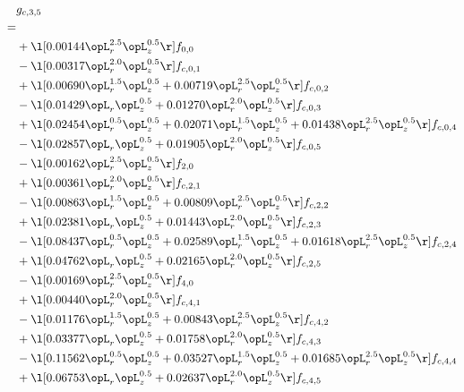 \begin{alignat}{2} 
\label{eq:g_35_0} 
& g_{c,3,5} \nonumber \\ 
 = \\ 
& + \l[  0.00144 \opL_r^{2.5} \opL_z^{0.5}  \r] f_{0,0} \nonumber \\ 
& - \l[  0.00317 \opL_r^{2.0} \opL_z^{0.5}  \r] f_{c,0,1} \nonumber \\ 
& + \l[  0.00690 \opL_r^{1.5} \opL_z^{0.5} +  0.00719 \opL_r^{2.5} \opL_z^{0.5}  \r] f_{c,0,2} \nonumber \\ 
& - \l[  0.01429 \opL_r \opL_z^{0.5} +  0.01270 \opL_r^{2.0} \opL_z^{0.5}  \r] f_{c,0,3} \nonumber \\ 
& + \l[  0.02454 \opL_r^{0.5} \opL_z^{0.5} +  0.02071 \opL_r^{1.5} \opL_z^{0.5} +  0.01438 \opL_r^{2.5} \opL_z^{0.5}  \r] f_{c,0,4} \nonumber \\ 
& - \l[  0.02857 \opL_r \opL_z^{0.5} +  0.01905 \opL_r^{2.0} \opL_z^{0.5}  \r] f_{c,0,5} \nonumber \\ 
& - \l[  0.00162 \opL_r^{2.5} \opL_z^{0.5}  \r] f_{2,0} \nonumber \\ 
& + \l[  0.00361 \opL_r^{2.0} \opL_z^{0.5}  \r] f_{c,2,1} \nonumber \\ 
& - \l[  0.00863 \opL_r^{1.5} \opL_z^{0.5} +  0.00809 \opL_r^{2.5} \opL_z^{0.5}  \r] f_{c,2,2} \nonumber \\ 
& + \l[  0.02381 \opL_r \opL_z^{0.5} +  0.01443 \opL_r^{2.0} \opL_z^{0.5}  \r] f_{c,2,3} \nonumber \\ 
& - \l[  0.08437 \opL_r^{0.5} \opL_z^{0.5} +  0.02589 \opL_r^{1.5} \opL_z^{0.5} +  0.01618 \opL_r^{2.5} \opL_z^{0.5}  \r] f_{c,2,4} \nonumber \\ 
& + \l[  0.04762 \opL_r \opL_z^{0.5} +  0.02165 \opL_r^{2.0} \opL_z^{0.5}  \r] f_{c,2,5} \nonumber \\ 
& - \l[  0.00169 \opL_r^{2.5} \opL_z^{0.5}  \r] f_{4,0} \nonumber \\ 
& + \l[  0.00440 \opL_r^{2.0} \opL_z^{0.5}  \r] f_{c,4,1} \nonumber \\ 
& - \l[  0.01176 \opL_r^{1.5} \opL_z^{0.5} +  0.00843 \opL_r^{2.5} \opL_z^{0.5}  \r] f_{c,4,2} \nonumber \\ 
& + \l[  0.03377 \opL_r \opL_z^{0.5} +  0.01758 \opL_r^{2.0} \opL_z^{0.5}  \r] f_{c,4,3} \nonumber \\ 
& - \l[  0.11562 \opL_r^{0.5} \opL_z^{0.5} +  0.03527 \opL_r^{1.5} \opL_z^{0.5} +  0.01685 \opL_r^{2.5} \opL_z^{0.5}  \r] f_{c,4,4} \nonumber \\ 
& + \l[  0.06753 \opL_r \opL_z^{0.5} +  0.02637 \opL_r^{2.0} \opL_z^{0.5}  \r] f_{c,4,5} \nonumber \\ 
\end{alignat} 


